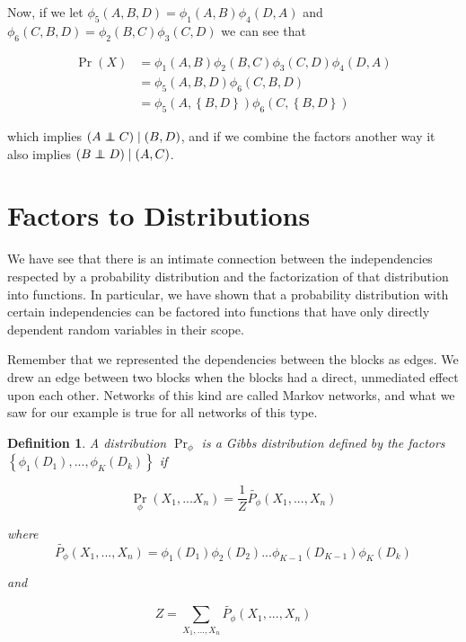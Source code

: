 \documentclass{article}
\newcommand\independent{\protect\mathpalette{\protect\independenT}{\perp}}
\def\independenT#1#2{\mathrel{\rlap{$#1#2$}\mkern2mu{#1#2}}}
\newtheorem{mydef}{Definition}
\begin{document}
Now, if we let $\phi_5(A,B,D) = \phi_1(A,B)\phi_4(D,A)$ and $\phi_6(C,B,D) = \phi_2(B,C)\phi_3(C,D)$ we can see that 

\begin{align}
\Pr(X) &= \phi_1(A,B)\phi_2(B,C)\phi_3(C,D)\phi_4(D,A) \\
&= \phi_5(A,B,D)\phi_6(C,B,D) \\
&= \phi_5(A,\left\{B,D\right\})\phi_6(C,\left\{B,D\right\})
\end{align}

which implies $(A\independent C) \mid (B,D)$, and if we combine the factors 
another way it also implies $(B\independent D) \mid (A,C)$.

\section{Factors to Distributions}
We have see that there is an intimate connection between the
independencies respected by a probability distribution and the
factorization of that distribution into functions. In particular, we
have shown that a probability distribution with certain independencies
can be factored into functions that have only directly dependent
random variables in their scope.

Remember that we represented the dependencies between the blocks as
edges. We drew an edge between two blocks when the blocks had a
direct, unmediated effect upon each other. Networks of this kind are
called Markov networks, and what we saw for our example is true for
all networks of this type.

\begin{mydef}
A distribution $\Pr_{\phi}$ is a Gibbs distribution defined by the factors
$\left\{\phi_1(D_1),...,\phi_K(D_k)\right\}$ if

\begin{equation}
\Pr_{\phi}(X_1,...X_n) = \frac{1}{Z}\tilde{P_{\phi}}(X_1,...,X_n)
\end{equation}

where
\begin{equation}
\tilde{P_{\phi}}(X_1,...,X_n) = \phi_1(D_1)\phi_2(D_2)...\phi_{K-1}(D_{K-1})\phi_K(D_k)
\end{equation}

and

\begin{equation}
Z = \sum_{X_1,...,X_n}\tilde{P_{\phi}}(X_1,...,X_n)
\end{equation}
\end{mydef}
\end{document}
